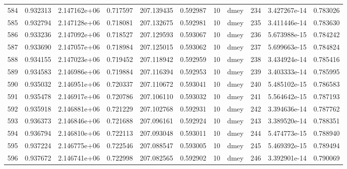 \begin{tabular}{lrrrrrrlrrr}
584  &    0.932313 &        2.147162e+06 &  0.717597 &              207.139435 &    0.592987 &      10 &         dmey &    234 &   3.427267e-14 &      0.783026 \\
585  &    0.932794 &        2.147128e+06 &  0.718081 &              207.132675 &    0.592981 &      10 &         dmey &    235 &   3.411446e-14 &      0.783630 \\
586  &    0.933236 &        2.147092e+06 &  0.718527 &              207.129593 &    0.593067 &      10 &         dmey &    236 &   5.673988e-15 &      0.784242 \\
587  &    0.933690 &        2.147057e+06 &  0.718984 &              207.125015 &    0.593062 &      10 &         dmey &    237 &   5.699663e-15 &      0.784824 \\
588  &    0.934155 &        2.147023e+06 &  0.719452 &              207.118942 &    0.592959 &      10 &         dmey &    238 &   3.434924e-14 &      0.785416 \\
589  &    0.934583 &        2.146986e+06 &  0.719884 &              207.116394 &    0.592953 &      10 &         dmey &    239 &   3.403333e-14 &      0.785995 \\
590  &    0.935032 &        2.146951e+06 &  0.720337 &              207.110672 &    0.593041 &      10 &         dmey &    240 &   5.485102e-15 &      0.786583 \\
591  &    0.935478 &        2.146917e+06 &  0.720786 &              207.106110 &    0.593032 &      10 &         dmey &    241 &   5.564642e-15 &      0.787193 \\
592  &    0.935918 &        2.146881e+06 &  0.721229 &              207.102768 &    0.592931 &      10 &         dmey &    242 &   3.394636e-14 &      0.787762 \\
593  &    0.936373 &        2.146846e+06 &  0.721688 &              207.096161 &    0.592924 &      10 &         dmey &    243 &   3.389520e-14 &      0.788351 \\
594  &    0.936794 &        2.146810e+06 &  0.722113 &              207.093048 &    0.593011 &      10 &         dmey &    244 &   5.474773e-15 &      0.788940 \\
595  &    0.937224 &        2.146775e+06 &  0.722546 &              207.088547 &    0.593005 &      10 &         dmey &    245 &   5.469392e-15 &      0.789494 \\
596  &    0.937672 &        2.146741e+06 &  0.722998 &              207.082565 &    0.592902 &      10 &         dmey &    246 &   3.392901e-14 &      0.790069 \\

\end{tabular}
